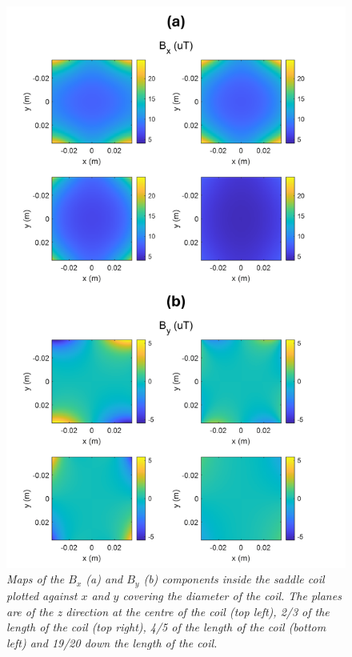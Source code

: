 \begin{figure}[H]
    \centering
    \includegraphics[width=0.85\linewidth]{Figures/Coils/Saddle_BMap.png}
    \caption{\textit{Maps of the $B_x$ (a) and $B_y$ (b) components inside the saddle coil plotted against $x$ and $y$ covering the diameter of the coil. The planes are of the z direction at the centre of the coil (top left), 2/3 of the length of the coil (top right), 4/5 of the length of the coil (bottom left) and 19/20 down the length of the coil.}}
    \label{fig:coils:Saddle_BMap}
\end{figure}

